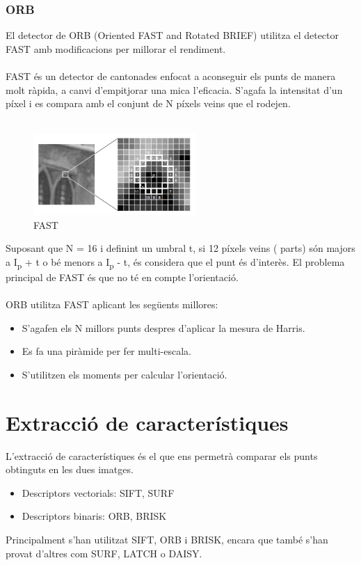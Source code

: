 	\subsubsection{ORB}
	El detector de ORB (Oriented FAST and Rotated BRIEF) utilitza el detector FAST amb modificacions per millorar el rendiment.\\\\
	FAST és un detector de cantonades enfocat a aconseguir els punts de manera molt ràpida, a canvi d'empitjorar una mica l'eficacia. S'agafa la intensitat d'un píxel i es compara amb el conjunt
	de N píxels veins que el rodejen.\\\\
	\begin{figure}[H]
		\centering
		\includegraphics[width=0.55\textwidth]{images/fast}
		\caption{FAST}
	\end{figure}
	\noindent
	Suposant que N = 16 i definint un umbral t, si 12 píxels veins ( parts) són majors a I\textsubscript{p} + t o bé menors a I\textsubscript{p} - t, és considera que el punt és d'interès.
	El problema principal de FAST és que no té en compte l'orientació.\\\\
	ORB utilitza FAST aplicant les següents millores:\\
	\begin{itemize}
		\item{S'agafen els N millors punts despres d'aplicar la mesura de Harris.}
		\item{Es fa una piràmide per fer multi-escala.}
		\item{S'utilitzen els moments per calcular l'orientació.}
	\end{itemize}

\section{Extracció de característiques}

	L'extracció de característiques és el que ens permetrà comparar els punts obtinguts en les dues imatges.\\
	\begin{itemize}
		\item{Descriptors vectorials: SIFT, SURF}
		\item{Descriptors binaris: ORB, BRISK\\}
	\end{itemize}
	Principalment s'han utilitzat SIFT, ORB i BRISK, encara que també s'han provat d'altres com SURF, LATCH o DAISY.

